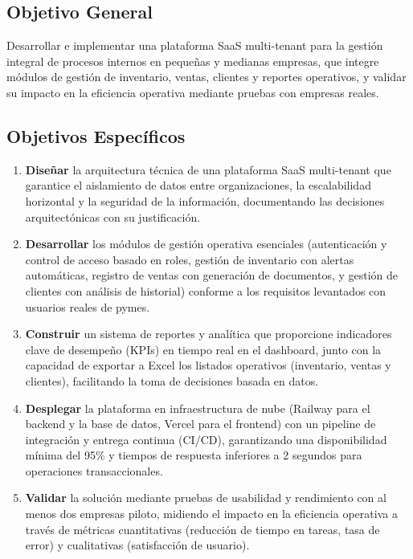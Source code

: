 \subsection{Objetivo General}\label{objetivo-general}

Desarrollar e implementar una plataforma SaaS multi-tenant para la gestión integral de procesos internos en pequeñas y medianas empresas, que integre módulos de gestión de inventario, ventas, clientes y reportes operativos, y validar su impacto en la eficiencia operativa mediante pruebas con empresas reales.

\subsection{Objetivos Específicos}\label{objetivos-especuxedficos}

\begin{enumerate}
\def\labelenumi{\arabic{enumi}.}
\item
  \textbf{Diseñar} la arquitectura técnica de una plataforma SaaS multi-tenant que garantice el aislamiento de datos entre organizaciones, la escalabilidad horizontal y la seguridad de la información, documentando las decisiones arquitectónicas con su justificación.
\item
  \textbf{Desarrollar} los módulos de gestión operativa esenciales (autenticación y control de acceso basado en roles, gestión de inventario con alertas automáticas, registro de ventas con generación de documentos, y gestión de clientes con análisis de historial) conforme a los requisitos levantados con usuarios reales de pymes.
\item
  \textbf{Construir} un sistema de reportes y analítica que proporcione indicadores clave de desempeño (KPIs) en tiempo real en el dashboard, junto con la capacidad de exportar a Excel los listados operativos (inventario, ventas y clientes), facilitando la toma de decisiones basada en datos.
\item
  \textbf{Desplegar} la plataforma en infraestructura de nube (Railway para el backend y la base de datos, Vercel para el frontend) con un pipeline de integración y entrega continua (CI/CD), garantizando una disponibilidad mínima del 95\% y tiempos de respuesta inferiores a 2 segundos para operaciones transaccionales.
\item
  \textbf{Validar} la solución mediante pruebas de usabilidad y rendimiento con al menos dos empresas piloto, midiendo el impacto en la eficiencia operativa a través de métricas cuantitativas (reducción de tiempo en tareas, tasa de error) y cualitativas (satisfacción de usuario).
\end{enumerate}

